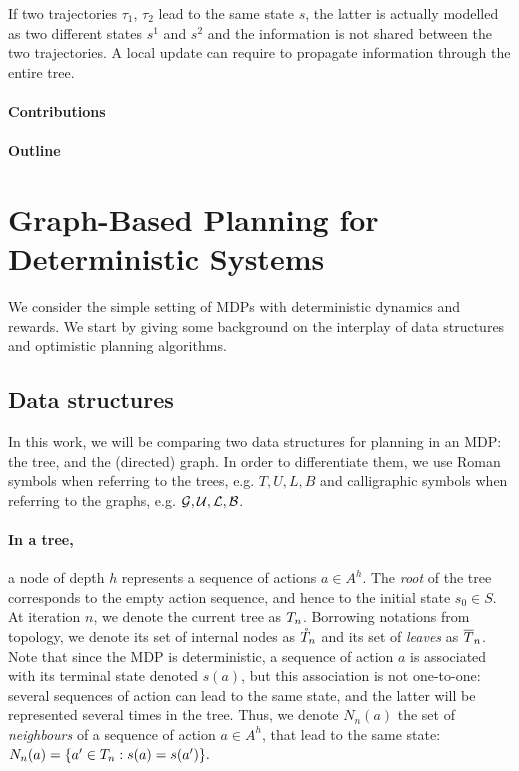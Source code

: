 \documentclass[runningheads]{llncs}
\begin{document}
If two trajectories $\tau_1$, $\tau_2$ lead to the same state $s$, the latter is actually modelled as two different states $s^1$ and $s^2$ and the information is not shared between the two trajectories. A local update can require to propagate information through the entire tree.

\paragraph{Contributions}

\paragraph{Outline}


\section{Graph-Based Planning for Deterministic Systems}

We consider the simple setting of MDPs with deterministic dynamics and rewards.
We start by giving some background on the interplay of data structures and optimistic planning algorithms.

\subsection{Data structures}

In this work, we will be comparing two data structures for planning in an MDP: the tree, and the (directed) graph. In order to differentiate them, we use Roman symbols when referring to the trees, e.g. $T, U, L, B$ and calligraphic symbols when referring to the graphs, e.g. $\mathcal{G}, \mathcal{U}, \mathcal{L}, \mathcal{B}$.

\paragraph{In a tree,} a node of depth $h$ represents a sequence of actions $a\in A^h$. The \textit{root} of the tree corresponds to the empty action sequence, and hence to the initial state $s_0\in S$. At iteration $n$, we denote the current tree as $T_n$. Borrowing notations from topology, we denote its set of internal nodes as $\mathring{T}_n$ and its set of \textit{leaves} as $\overline{T}_n$. Note that since the MDP is deterministic, a sequence of action $a$ is associated with its terminal state denoted $s(a)$, but this association is not one-to-one: several sequences of action can lead to the same state, and the latter will be represented several times in the tree. Thus, we denote $N_n(a)$ the set of \emph{neighbours} of a sequence of action $a\in A^h$, that lead to the same state:  $N_n(a) = \{a'\in T_n: s(a)=s(a')\}.$
\end{document}
